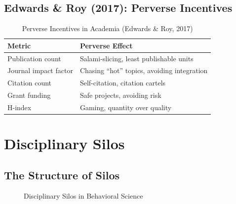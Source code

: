 \subsection{Edwards \& Roy (2017): Perverse Incentives}

\begin{table}[htbp]
\centering
\caption{Perverse Incentives in Academia (Edwards \& Roy, 2017)}
\label{tab:perverse}
\renewcommand{\arraystretch}{1.3}
\begin{tabular}{@{}ll@{}}
\toprule
\textbf{Metric} & \textbf{Perverse Effect} \\
\midrule
Publication count & Salami-slicing, least publishable units \\
Journal impact factor & Chasing ``hot'' topics, avoiding integration \\
Citation count & Self-citation, citation cartels \\
Grant funding & Safe projects, avoiding risk \\
H-index & Gaming, quantity over quality \\
\bottomrule
\end{tabular}
\end{table}



\section{Disciplinary Silos}
\label{sec:meta-silos}

\subsection{The Structure of Silos}

\begin{figure}[htbp]
\centering
{}
\caption{Disciplinary Silos in Behavioral Science}
\label{fig:silos}
\end{figure}

